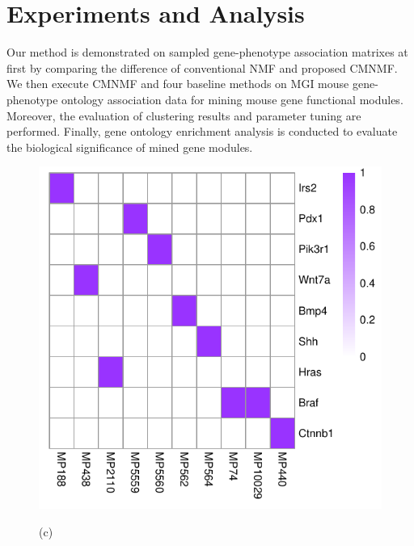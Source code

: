 \documentclass{bmcart}
\begin{document}
\section*{Experiments and Analysis}
Our method is demonstrated on sampled gene-phenotype association matrixes at first by comparing the difference of conventional NMF and proposed CMNMF. We then execute CMNMF and four baseline methods on MGI mouse gene-phenotype ontology association data for mining mouse gene functional modules. Moreover, the evaluation of clustering results and parameter tuning are performed. Finally, gene ontology enrichment analysis is conducted to evaluate the biological significance of mined gene modules.
\begin{figure}[!h]
  \centering
  \begin{minipage}{.4\linewidth}
   \includegraphics[width=\linewidth]{DrawPictures/v_4.pdf}
    \centerline{(c)}
  \end{minipage}

\end{figure}
\end{document}
